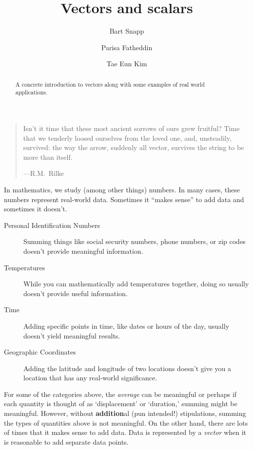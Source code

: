 \documentclass{ximera}
\author{Bart Snapp \and Parisa Fatheddin \and Tae Eun Kim}
\title{Vectors and scalars}
\begin{document}
\begin{abstract}
  A concrete introduction to vectors along with some examples of real world applications.
\end{abstract}
\maketitle


\begin{quote}
  Isn’t it time that these most ancient sorrows of ours grew fruitful?
  Time that we tenderly loosed ourselves from the loved one, and,
  unsteadily, survived: the way the arrow, suddenly all vector,
  survives the string to be more than itself.



  \hfill ---R.M.\ Rilke
\end{quote}


In mathematics, we study (among other things) numbers. In many cases,
these numbers represent real-world data. Sometimes it ``makes sense''
to add data and sometimes it doesn't.
\begin{concept}
\begin{description}
\item[Personal Identification Numbers] Summing things like social
  security numbers, phone numbers, or zip codes doesn't provide
  meaningful information.
\item[Temperatures] While you can mathematically add temperatures
  together, doing so usually doesn't provide useful information.
\item[Time] Adding specific points in time, like dates or hours of the
  day, usually doesn't yield meaningful results.
\item[Geographic Coordinates] Adding the latitude and longitude of two
  locations doesn't give you a location that has any real-world
  significance.
\end{description}
\end{concept}
For some of the categories above, the \textit{average} can be
meaningful or perhaps if each quantity is thought of as `displacement'
or `duration,' summing might be meaningful. However, without
\textbf{addition}al (pun intended!) stipulations, summing the types of
quantities above is not meaningful. On the other hand, there are lots
of times that it makes sense to add data. Data is represented by a
\textit{vector} when it is reasonable to add separate data points.
\end{document}
